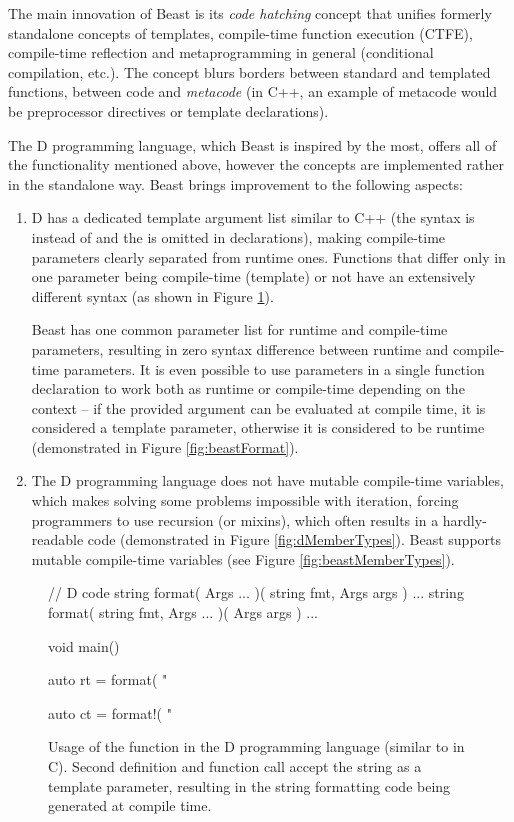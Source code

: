 \documentclass{ExcelAtFIT}
\begin{document}
The main innovation of Beast is its \textit{code hatching} concept that unifies formerly standalone concepts of templates, compile-time function execution (CTFE), compile-time reflection and metaprogramming in general (conditional compilation, etc.). The concept blurs borders between standard and templated functions, between code and \textit{metacode} (in C++, an example of metacode would be preprocessor directives or template declarations).

The D programming language, which Beast is inspired by the most, offers all of the functionality mentioned above, however the concepts are implemented rather in the standalone way. Beast brings improvement to the following aspects:
\begin{enumerate}
	\item D has a dedicated template argument list similar to C++ (the syntax is  instead of  and the \inlineDCode{!} is omitted in declarations), making compile-time parameters clearly separated from runtime ones. Functions that differ only in one parameter being compile-time (template) or not have an extensively different syntax (as shown in Figure \ref{fig:dFormat}).
 
 	Beast has one common parameter list for runtime and compile-time parameters, resulting in zero syntax difference between runtime and com\-pile-time parameters. It is even possible to use parameters in a single function declaration to work both as runtime or compile-time depending on the context -- if the provided argument can be evaluated at compile time, it is considered a template parameter, otherwise it is considered to be runtime (demonstrated in Figure \ref{fig:beastFormat}).

	\item The D programming language does not have mutable compile-time variables, which makes solving some problems impossible with iteration, forcing programmers to use recursion (or mixins), which often results in a hardly-readable code (demonstrated in Figure \ref{fig:dMemberTypes}). Beast supports mutable compile-time variables (see Figure \ref{fig:beastMemberTypes}).
\end{enumerate}

\begin{figure}[h]
	\begin{dcode}
		// D code
		string format( Args ... )( string fmt, Args args ) { ... }
		string format( string fmt, Args ... )( Args args ) { ... }
		
		void main() {
			auto rt = format( "%
			
			auto ct = format!( "%
		}
	\end{dcode}
	\caption{Usage of the  function in the D programming language (similar to  in C). Second  definition and function call accept the  string as a template parameter, resulting in the string formatting code being generated at compile time.}
	\label{fig:dFormat}
\end{figure}
\end{document}
